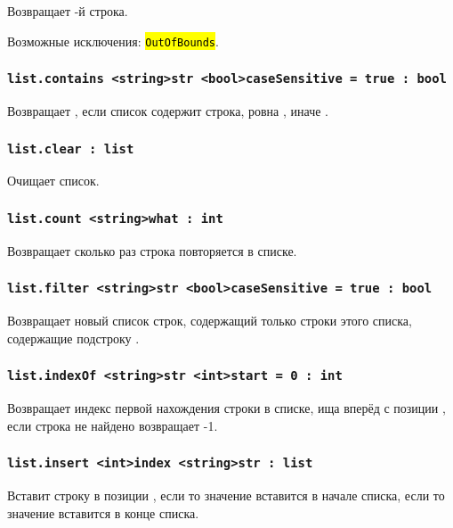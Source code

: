 \documentclass[a4paper, 14pt]{extarticle}
\newcommand{\ferror}[1]{{\fontsize{11pt}{12pt}\tt{\sethlcolor{yellow}\hl{#1}}}}
\begin{document}
Возвращает -й строка.

Возможные исключения: \ferror{OutOfBounds}.

\subsubsection{\lstinline|list.contains <string>str <bool>caseSensitive = true : bool|}

Возвращает \true, если список содержит строка, ровна , иначе \false.

\subsubsection{\lstinline|list.clear : list|}

Очищает список.

\subsubsection{\lstinline|list.count <string>what : int|}

Возвращает сколько раз строка  повторяется в списке.

\subsubsection{\lstinline|list.filter <string>str <bool>caseSensitive = true : bool|}

Возвращает новый список строк, содержащий только строки этого списка, содержащие подстроку . 

\subsubsection{\lstinline|list.indexOf <string>str <int>start = 0 : int|}

Возвращает индекс первой нахождения строки  в списке, ища вперёд с позиции , если строка не найдено возвращает -1.

\subsubsection{\lstinline|list.insert <int>index <string>str : list|}

Вставит строку  в позиции , если  то значение вставится в начале списка, если  то значение вставится в конце списка.
\end{document}
